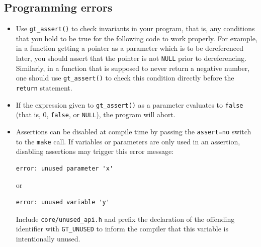 \documentclass[11pt,final]{article}
\newcommand{\keyword}[1]{\lstinline{#1}}
\begin{document}
\subsection{Programming errors}
\begin{itemize}
\item
Use \keyword{gt_assert()} to check invariants in your program, that is, any
conditions that you hold to be true for the following code to work properly.
For example, in a function getting a pointer as a parameter which is to be
dereferenced later, you should assert that the pointer is not \keyword{NULL}
prior to dereferencing.
Similarly, in a function that is supposed to never return a negative number,
one should use \keyword{gt_assert()} to check this condition directly before the
\keyword{return} statement.
\item
If the expression given to \keyword{gt_assert()} as a parameter evaluates to
\keyword{false} (that is, 0, \keyword{false}, or \keyword{NULL}), the program
will abort.
\item
Assertions can be disabled at compile time by passing the \keyword{assert=no}
switch to the \keyword{make} call. If variables or parameters are only used in
an assertion, disabling assertions may trigger this error message:
\begin{lstlisting}
error: unused parameter 'x'
\end{lstlisting}
or
\begin{lstlisting}
error: unused variable 'y'
\end{lstlisting}
Include \keyword{core/unused_api.h} and prefix the declaration of the offending
identifier with \keyword{GT_UNUSED} to inform the compiler that this variable is
intentionally unused.
\end{itemize}
\end{document}
